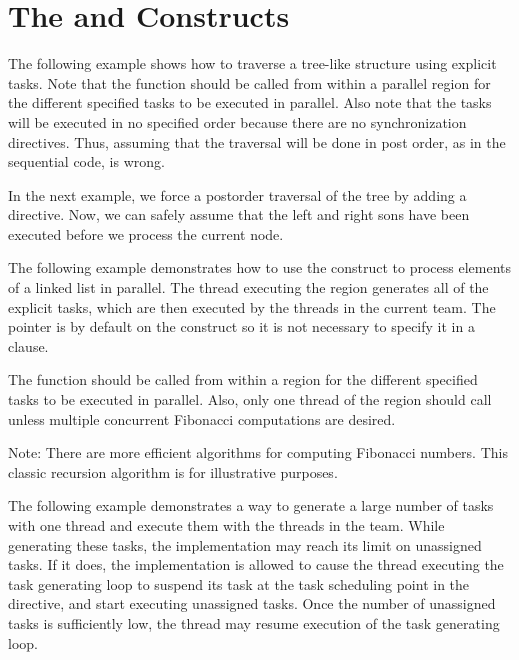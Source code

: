\pagebreak
\section{The  and  Constructs}
\label{sec:task_taskwait}

The following example shows how to traverse a tree-like structure using explicit 
tasks. Note that the  function should be called from within a 
parallel region for the different specified tasks to be executed in parallel. Also 
note that the tasks will be executed in no specified order because there are no 
synchronization directives. Thus, assuming that the traversal will be done in post 
order, as in the sequential code, is wrong.



In the next example, we force a postorder traversal of the tree by adding a  
directive. Now, we can safely assume that the left and right sons have been executed 
before we process the current node.



The following example demonstrates how to use the  construct to process 
elements of a linked list in parallel. The thread executing the  
region generates all of the explicit tasks, which are then executed by the threads 
in the current team. The pointer  is  by default 
on the  construct so it is not necessary to specify it in a  
clause.



The  function should be called from within a   region 
for the different specified tasks to be executed in parallel. Also, only one thread 
of the  region should call  unless multiple concurrent 
Fibonacci computations are desired. 



Note: There are more efficient algorithms for computing Fibonacci numbers. This 
classic recursion algorithm is for illustrative purposes.

The following example demonstrates a way to generate a large number of tasks with 
one thread and execute them with the threads in the team. While generating these 
tasks, the implementation may reach its limit on unassigned tasks.  If it does, 
the implementation is allowed to cause the thread executing the task generating 
loop to suspend its task at the task scheduling point in the  directive, 
and start executing unassigned tasks.  Once the number of unassigned tasks is sufficiently 
low, the thread may resume execution of the task generating loop.

